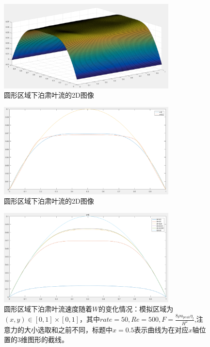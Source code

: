 \documentclass[11pt,UTF8]{ctexart}
\begin{document}
    \begin{figure}[h]
        \centerline{\includegraphics[width=0.8\textwidth]{P_3D.png}}
        \caption{圆形区域下泊肃叶流的2D图像}
        \label{img17}
    \end{figure}
    \begin{figure}[h]
        \centerline{\includegraphics[width=0.8\textwidth]{P_2D.png}}
        \caption{圆形区域下泊肃叶流的2D图像}
        \label{img18}
    \end{figure}
    \begin{figure}[h]
        \centerline{\includegraphics[width=0.8\textwidth]{Circula_F_W_x=0.PNG}}
        \caption{圆形区域下泊肃叶流速度随着$W$的变化情况：模拟区域为$(x,y)\in [0,1]\times [0,1]$，其中$rate=50,Re=500,F=\frac{8\rho u_{peak} \eta_l}{H^2}$,注意力的大小选取和之前不同，标题中$x=0.5$表示曲线为在对应$x$轴位置的3维图形的截线。}
        \label{img19}
    \end{figure}
\end{document}
